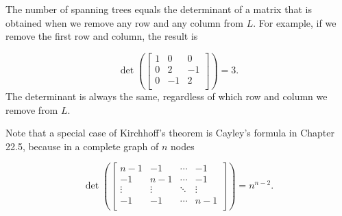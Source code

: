 The number of spanning trees equals
the determinant of a matrix that is obtained
when we remove any row and any column from $L$.
For example, if we remove the first row
and column, the result is

\[ \det(
\begin{bmatrix}
  1 & 0 & 0 \\
  0 & 2 & -1 \\
  0 & -1 & 2 \\
 \end{bmatrix}
) =3.\]
The determinant is always the same,
regardless of which row and column we remove from $L$.

Note that a special case of Kirchhoff's theorem
is Cayley's formula in Chapter 22.5,
because in a complete graph of $n$ nodes

\[ \det(
\begin{bmatrix}
  n-1 & -1 & \cdots & -1 \\
  -1 & n-1 & \cdots & -1 \\
  \vdots & \vdots & \ddots & \vdots \\
  -1 & -1 & \cdots & n-1 \\
 \end{bmatrix}
) =n^{n-2}.\]



